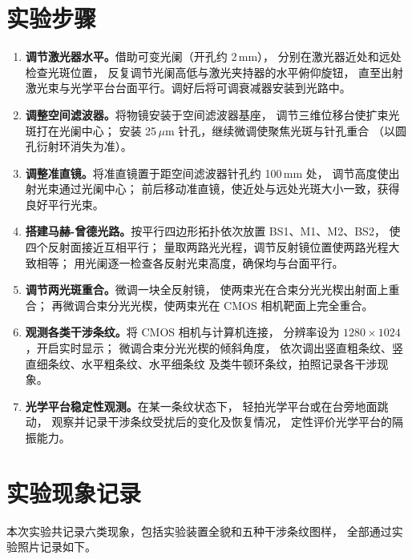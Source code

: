 \documentclass[12pt, a4paper]{article}
\begin{document}
\section{实验步骤}

\begin{enumerate}
  \item \textbf{调节激光器水平。}借助可变光阑（开孔约 2\,mm），
        分别在激光器近处和远处检查光斑位置，
        反复调节光阑高低与激光夹持器的水平俯仰旋钮，
        直至出射激光束与光学平台台面平行。调好后将可调衰减器安装到光路中。

  \item \textbf{调整空间滤波器。}将物镜安装于空间滤波器基座，
        调节三维位移台使扩束光斑打在光阑中心；
        安装 25\,$\mu$m 针孔，继续微调使聚焦光斑与针孔重合
        （以圆孔衍射环消失为准）。

  \item \textbf{调整准直镜。}将准直镜置于距空间滤波器针孔约 100\,mm 处，
        调节高度使出射光束通过光阑中心；
        前后移动准直镜，使近处与远处光斑大小一致，获得良好平行光束。

  \item \textbf{搭建马赫-曾德光路。}按平行四边形拓扑依次放置 BS1、M1、M2、BS2，
        使四个反射面接近互相平行；
        量取两路光光程，调节反射镜位置使两路光程大致相等；
        用光阑逐一检查各反射光束高度，确保均与台面平行。

  \item \textbf{调节两光斑重合。}微调一块全反射镜，
        使两束光在合束分光光楔出射面上重合；
        再微调合束分光光楔，使两束光在 CMOS 相机靶面上完全重合。

  \item \textbf{观测各类干涉条纹。}将 CMOS 相机与计算机连接，
        分辨率设为 $1280 \times 1024$，开启实时显示；
        微调合束分光光楔的倾斜角度，
        依次调出竖直粗条纹、竖直细条纹、水平粗条纹、水平细条纹
        及类牛顿环条纹，拍照记录各干涉现象。

  \item \textbf{光学平台稳定性观测。}在某一条纹状态下，
        轻拍光学平台或在台旁地面跳动，
        观察并记录干涉条纹受扰后的变化及恢复情况，
        定性评价光学平台的隔振能力。
\end{enumerate}

\section{实验现象记录}

本次实验共记录六类现象，包括实验装置全貌和五种干涉条纹图样，
全部通过实验照片记录如下。
\end{document}
